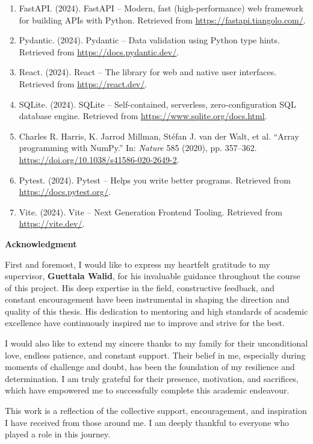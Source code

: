 \documentclass[12pt,a4paper,oneside]{report}
\renewcommand{\url}[1]{\href{#1}{\textcolor{linkblue}{\uline{#1}}}}
\begin{document}
\begin{enumerate}[leftmargin=1.9em,label=\arabic*.,labelsep=0.45em,itemsep=0.15em,topsep=0.1em,parsep=0pt,partopsep=0pt]
    \item FastAPI. (2024). FastAPI -- Modern, fast (high-performance) web framework for building APIs with Python. Retrieved from \url{https://fastapi.tiangolo.com/}.
    \item Pydantic. (2024). Pydantic -- Data validation using Python type hints. Retrieved from \url{https://docs.pydantic.dev/}.
    \item React. (2024). React -- The library for web and native user interfaces. Retrieved from \url{https://react.dev/}.
    \item SQLite. (2024). SQLite -- Self-contained, serverless, zero-configuration SQL database engine. Retrieved from \url{https://www.sqlite.org/docs.html}.
    \item Charles R. Harris, K. Jarrod Millman, Stéfan J. van der Walt, et al. ``Array programming with NumPy.'' In: \emph{Nature} 585 (2020), pp. 357--362. \url{https://doi.org/10.1038/s41586-020-2649-2}.
    \item Pytest. (2024). Pytest -- Helps you write better programs. Retrieved from \url{https://docs.pytest.org/}.
    \item Vite. (2024). Vite -- Next Generation Frontend Tooling. Retrieved from \url{https://vite.dev/}.
\end{enumerate}
\endgroup

\clearpage
{}
{\hypersetup{linkcolor=black}\listoffigures}
\clearpage
{}
{}
\thispagestyle{plain}

\begin{center}
\textbf{Acknowledgment}
\end{center}

\vspace{1.5em}

\begingroup
\large
{}

First and foremost, I would like to express my heartfelt gratitude to my supervisor, \textbf{Guettala Walid}, for his invaluable guidance throughout the course of this project. His deep expertise in the field, constructive feedback, and constant encouragement have been instrumental in shaping the direction and quality of this thesis. His dedication to mentoring and high standards of academic excellence have continuously inspired me to improve and strive for the best.

I would also like to extend my sincere thanks to my family for their unconditional love, endless patience, and constant support. Their belief in me, especially during moments of challenge and doubt, has been the foundation of my resilience and determination. I am truly grateful for their presence, motivation, and sacrifices, which have empowered me to successfully complete this academic endeavour.

This work is a reflection of the collective support, encouragement, and inspiration I have received from those around me. I am deeply thankful to everyone who played a role in this journey.
\endgroup
\end{document}
